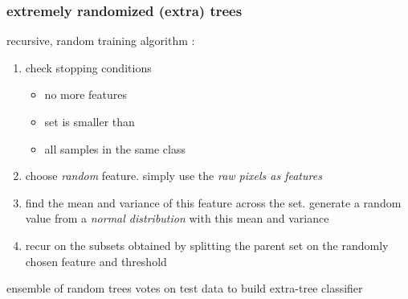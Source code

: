 \begin{frame}
  \frametitle{extremely randomized (extra) trees}

  recursive, random training algorithm \cite{wiki:et} :
  \begin{enumerate}
  \item check stopping conditions
    \begin{itemize}
    \item no more features
    \item set is smaller than 
    \item all samples in the same class
    \end{itemize}
  \item choose \emph{random} feature. simply use the \emph{raw pixels as features} 
  \item find the mean and variance of this feature across the set. generate a random value from a \emph{normal distribution} with this mean and variance
  \item recur on the subsets obtained by splitting the parent set on the randomly chosen feature and threshold
  \end{enumerate}

  ensemble of random trees votes on test data to build extra-tree classifier

\end{frame}